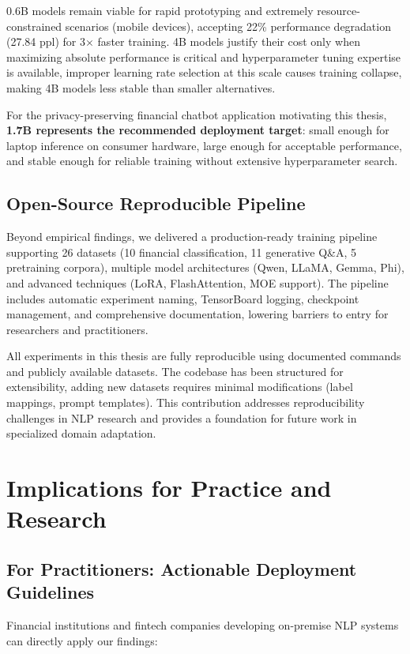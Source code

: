 0.6B models remain viable for rapid prototyping and extremely resource-constrained scenarios (mobile devices), accepting 22\% performance degradation (27.84 ppl) for 3$\times$ faster training. 4B models justify their cost only when maximizing absolute performance is critical and hyperparameter tuning expertise is available, improper learning rate selection at this scale causes training collapse, making 4B models less stable than smaller alternatives.

For the privacy-preserving financial chatbot application motivating this thesis, \textbf{1.7B represents the recommended deployment target}: small enough for laptop inference on consumer hardware, large enough for acceptable performance, and stable enough for reliable training without extensive hyperparameter search.

\subsection{Open-Source Reproducible Pipeline}

Beyond empirical findings, we delivered a production-ready training pipeline supporting 26 datasets (10 financial classification, 11 generative Q\&A, 5 pretraining corpora), multiple model architectures (Qwen, LLaMA, Gemma, Phi), and advanced techniques (LoRA, FlashAttention, MOE support). The pipeline includes automatic experiment naming, TensorBoard logging, checkpoint management, and comprehensive documentation, lowering barriers to entry for researchers and practitioners.

All experiments in this thesis are fully reproducible using documented commands and publicly available datasets. The codebase has been structured for extensibility, adding new datasets requires minimal modifications (label mappings, prompt templates). This contribution addresses reproducibility challenges in NLP research and provides a foundation for future work in specialized domain adaptation.

\section{Implications for Practice and Research}

\subsection{For Practitioners: Actionable Deployment Guidelines}

Financial institutions and fintech companies developing on-premise NLP systems can directly apply our findings:

